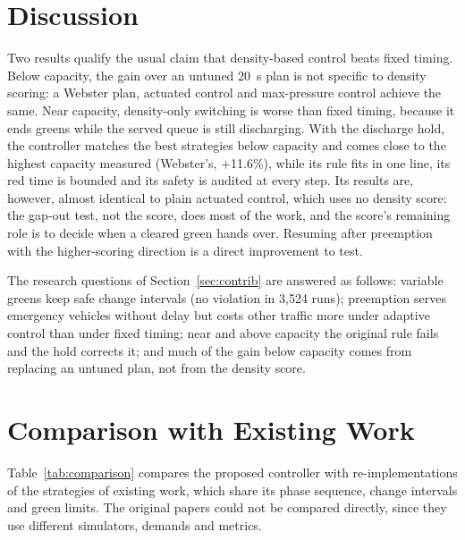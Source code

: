 \section{Discussion}
Two results qualify the usual claim that density-based control beats fixed timing. Below capacity, the gain over an untuned 20~s plan is not specific to density scoring: a Webster plan, actuated control and max-pressure control achieve the same. Near capacity, density-only switching is worse than fixed timing, because it ends greens while the served queue is still discharging. With the discharge hold, the controller matches the best strategies below capacity and comes close to the highest capacity measured (Webster's, +11.6\%), while its rule fits in one line, its red time is bounded and its safety is audited at every step. Its results are, however, almost identical to plain actuated control, which uses no density score: the gap-out test, not the score, does most of the work, and the score's remaining role is to decide when a cleared green hands over. Resuming after preemption with the higher-scoring direction is a direct improvement to test.

The research questions of Section~\ref{sec:contrib} are answered as follows: variable greens keep safe change intervals (no violation in 3,524 runs); preemption serves emergency vehicles without delay but costs other traffic more under adaptive control than under fixed timing; near and above capacity the original rule fails and the hold corrects it; and much of the gain below capacity comes from replacing an untuned plan, not from the density score.

\section{Comparison with Existing Work}
Table~\ref{tab:comparison} compares the proposed controller with re-implementations of the strategies of existing work, which share its phase sequence, change intervals and green limits. The original papers could not be compared directly, since they use different simulators, demands and metrics.

